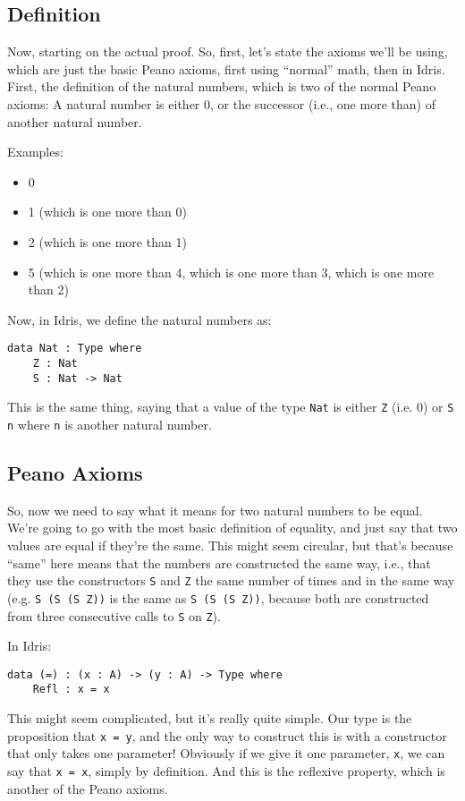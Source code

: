 \documentclass{article}
\newcommand{\inline}[1]{\texttt{#1}}
\begin{document}
\subsection{Definition}
Now, starting on the actual proof.
So, first, let's state the axioms we'll be using, which are just the basic Peano axioms, first using ``normal'' math, then in Idris.
First, the definition of the natural numbers, which is two of the normal Peano axioms:
A natural number is either 0, or the successor (i.e., one more than) of another natural number.

Examples:
\begin{itemize}
    \item 0
    \item 1 (which is one more than 0)
    \item 2 (which is one more than 1)
    \item 5 (which is one more than 4, which is one more than 3, which is one more than 2)
\end{itemize}

Now, in Idris, we define the natural numbers as:
\begin{verbatim}
data Nat : Type where
    Z : Nat
    S : Nat -> Nat
\end{verbatim}

This is the same thing, saying that a value of the type \inline{Nat} is either \inline{Z} (i.e. 0) or \inline{S n} where \inline{n} is another natural number.

\subsection{Peano Axioms}

So, now we need to say what it means for two natural numbers to be equal.
We're going to go with the most basic definition of equality, and just say that two values are equal if they're the same.
This might seem circular, but that's because ``same'' here means that the numbers are constructed the same way, i.e., that they use the constructors \inline{S} and \inline{Z} the same number of times and in the same way (e.g. \inline{S (S (S Z))} is the same as \inline{S (S (S Z))}, because both are constructed from three consecutive calls to \inline{S} on \inline{Z}).

In Idris:
\begin{verbatim}
data (=) : (x : A) -> (y : A) -> Type where
    Refl : x = x
\end{verbatim}

This might seem complicated, but it's really quite simple.
Our type is the proposition that \inline{x = y}, and the only way to construct this is with a constructor that only takes one parameter!
Obviously if we give it one parameter, \inline{x}, we can say that \inline{x = x}, simply by definition.
And this is the reflexive property, which is another of the Peano axioms.
\end{document}

